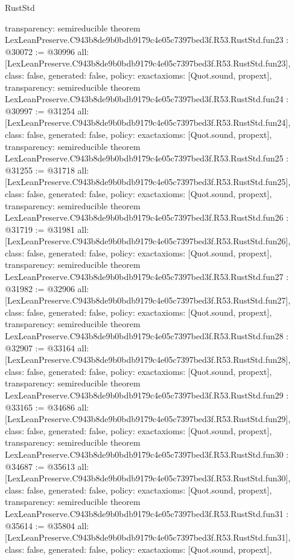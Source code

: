 \begin{lexlean}{RustStd}
\begin{coremodule}
{  transparency: semireducible
}
theorem LexLeanPreserve.C943b8de9b0bdb9179c4e05c7397bed3f.R53.RustStd.fun23 : @30072 := @30996 {
  all: [LexLeanPreserve.C943b8de9b0bdb9179c4e05c7397bed3f.R53.RustStd.fun23],
  class: false,
  generated: false,
  policy: exact{axioms: [Quot.sound, propext]},
  transparency: semireducible
}
theorem LexLeanPreserve.C943b8de9b0bdb9179c4e05c7397bed3f.R53.RustStd.fun24 : @30997 := @31254 {
  all: [LexLeanPreserve.C943b8de9b0bdb9179c4e05c7397bed3f.R53.RustStd.fun24],
  class: false,
  generated: false,
  policy: exact{axioms: [Quot.sound, propext]},
  transparency: semireducible
}
theorem LexLeanPreserve.C943b8de9b0bdb9179c4e05c7397bed3f.R53.RustStd.fun25 : @31255 := @31718 {
  all: [LexLeanPreserve.C943b8de9b0bdb9179c4e05c7397bed3f.R53.RustStd.fun25],
  class: false,
  generated: false,
  policy: exact{axioms: [Quot.sound, propext]},
  transparency: semireducible
}
theorem LexLeanPreserve.C943b8de9b0bdb9179c4e05c7397bed3f.R53.RustStd.fun26 : @31719 := @31981 {
  all: [LexLeanPreserve.C943b8de9b0bdb9179c4e05c7397bed3f.R53.RustStd.fun26],
  class: false,
  generated: false,
  policy: exact{axioms: [Quot.sound, propext]},
  transparency: semireducible
}
theorem LexLeanPreserve.C943b8de9b0bdb9179c4e05c7397bed3f.R53.RustStd.fun27 : @31982 := @32906 {
  all: [LexLeanPreserve.C943b8de9b0bdb9179c4e05c7397bed3f.R53.RustStd.fun27],
  class: false,
  generated: false,
  policy: exact{axioms: [Quot.sound, propext]},
  transparency: semireducible
}
theorem LexLeanPreserve.C943b8de9b0bdb9179c4e05c7397bed3f.R53.RustStd.fun28 : @32907 := @33164 {
  all: [LexLeanPreserve.C943b8de9b0bdb9179c4e05c7397bed3f.R53.RustStd.fun28],
  class: false,
  generated: false,
  policy: exact{axioms: [Quot.sound, propext]},
  transparency: semireducible
}
theorem LexLeanPreserve.C943b8de9b0bdb9179c4e05c7397bed3f.R53.RustStd.fun29 : @33165 := @34686 {
  all: [LexLeanPreserve.C943b8de9b0bdb9179c4e05c7397bed3f.R53.RustStd.fun29],
  class: false,
  generated: false,
  policy: exact{axioms: [Quot.sound, propext]},
  transparency: semireducible
}
theorem LexLeanPreserve.C943b8de9b0bdb9179c4e05c7397bed3f.R53.RustStd.fun30 : @34687 := @35613 {
  all: [LexLeanPreserve.C943b8de9b0bdb9179c4e05c7397bed3f.R53.RustStd.fun30],
  class: false,
  generated: false,
  policy: exact{axioms: [Quot.sound, propext]},
  transparency: semireducible
}
theorem LexLeanPreserve.C943b8de9b0bdb9179c4e05c7397bed3f.R53.RustStd.fun31 : @35614 := @35804 {
  all: [LexLeanPreserve.C943b8de9b0bdb9179c4e05c7397bed3f.R53.RustStd.fun31],
  class: false,
  generated: false,
  policy: exact{axioms: [Quot.sound, propext]},
}
\end{coremodule}
\end{lexlean}
